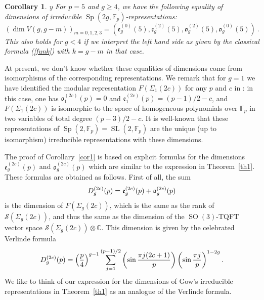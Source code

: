 \documentclass{amsart}
\newtheorem{cor}[thm]{Corollary}
\begin{document}
\begin{cor}{\label{{cor1}}{
	 y
	\fi
}} For $p=5$ and $g\geq 4$, we have the following equality of
  dimensions 
of irreducible 
 $\operatorname{Sp}(2g,{{\mathbb{F}}}_p)$-representations: 
$$
      (\dim V(g,g  -m))_{m=0,1,2,3} 
= (  {\mathfrak{e}}_g^{(0)}(5),{\mathfrak{e}}_g^{(2)}(5),{\mathfrak{o}}_g^{(2)}(5),{\mathfrak{o}}_g^{(0)}(5))~.$$
This also holds  for $g<4$ if we
 interpret the left hand side as given by the classical formula
 (\ref{funk}) with $k=g-m$ 
in that case.
\end{cor}  
 

At present, we don't  
know whether these equalities of dimensions
come from isomorphisms of the corresponding  
representations. We remark that for $g=1$ we have
identified the modular representation $F(\Sigma_1(2c))$ for any $p$ and
$c$ in \cite{GM2}:
in this case, one has ${\mathfrak{o}}_1^{(2c)}(p)=0$ and ${\mathfrak{e}}_1^{(2c)}(p)=
(p-1)/2-c$, and $F(\Sigma_1(2c))$ is isomorphic to the space of homogeneous
polynomials over ${{\mathbb{F}}}_p$ in two variables of total degree $(p-3)/2-c$. It is
well-known that 
these representations
of $\operatorname{Sp}(2,{{\mathbb{F}}}_p)=\operatorname{SL}(2,{{\mathbb{F}}}_p)$ 
are 
the unique
(up to isomorphism) 
irreducible  
representations with these dimensions.   

\vskip 8pt

The proof of Corollary~\ref{cor1} is based on explicit formulas for
the dimensions  ${\mathfrak{e}}_g^{(2c)}(p)$ and $ {\mathfrak{o}}_g^{(2c)}(p)$ which are
similar to the expression in
Theorem~\ref{th1}. These formulas are obtained as follows. First of
all, the 
 sum
\begin{equation} {\label{{sum1}}{
	\if{n} y
		\smash{\makebox[0pt]{\hspace{-0.5in}
			\raisebox{8pt}{\tt\tiny {{sum1}}}}}
	\fi
}} D_g^{(2c)}(p)= {\mathfrak{e}}_g^{(2c)}(p)+{\mathfrak{o}}_g^{(2c)}(p)
\end{equation} is the dimension of  $F({{\Sigma}}_g(2c))$, which is the same
as the rank of ${{\mathcal{S}}}({{\Sigma}}_g(2c))$, and thus the same as the dimension of
the $\operatorname{SO}(3)$-TQFT vector space 
${{\mathcal{S}}}({{\Sigma}}_g(2c))\otimes {\mathbb C}$.
This
dimension is
given by the celebrated Verlinde formula
\begin{equation}{\label{{Verl}}{
	\if{n} y
		\smash{\makebox[0pt]{\hspace{-0.5in}
			\raisebox{8pt}{\tt\tiny {{Verl}}}}}
	\fi
}} 
D_g^{(2c)}(p)=\left( \frac p 4\right)^{g-1} \sum_{j=1}^{(p-1)/2}
\left(\sin \frac { \pi j(2c+1)}{p}\right) \left( \sin \frac { \pi j}{p} \right)^{1-2g}
.\end{equation}   
We  
like to think of our expression for the dimensions of Gow's irreducible representations in
Theorem~\ref{th1} as an analogue of the Verlinde formula.
\end{document}

